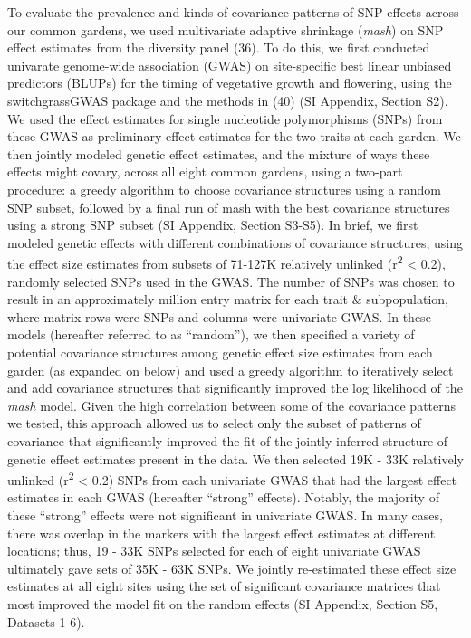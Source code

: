 \documentclass[
  9pt,
  twocolumn,
  twoside]{pnas-new}
\begin{document}
To evaluate the prevalence and kinds of covariance patterns of SNP
effects across our common gardens, we used multivariate adaptive
shrinkage (\emph{mash}) on SNP effect estimates from the diversity panel
(36). To do this, we first conducted univarate genome-wide association
(GWAS) on site-specific best linear unbiased predictors (BLUPs) for the
timing of vegetative growth and flowering, using the switchgrassGWAS
package and the methods in (40) (SI Appendix, Section S2). We used the
effect estimates for single nucleotide polymorphisms (SNPs) from these
GWAS as preliminary effect estimates for the two traits at each garden.
We then jointly modeled genetic effect estimates, and the mixture of
ways these effects might covary, across all eight common gardens, using
a two-part procedure: a greedy algorithm to choose covariance structures
using a random SNP subset, followed by a final run of mash with the best
covariance structures using a strong SNP subset (SI Appendix, Section
S3-S5). In brief, we first modeled genetic effects with different
combinations of covariance structures, using the effect size estimates
from subsets of 71-127K relatively unlinked (r\textsuperscript{2}
\textless{} 0.2), randomly selected SNPs used in the GWAS. The number of
SNPs was chosen to result in an approximately million entry matrix for
each trait \& subpopulation, where matrix rows were SNPs and columns
were univariate GWAS. In these models (hereafter referred to as
``random''), we then specified a variety of potential covariance
structures among genetic effect size estimates from each garden (as
expanded on below) and used a greedy algorithm to iteratively select and
add covariance structures that significantly improved the log likelihood
of the \emph{mash} model. Given the high correlation between some of the
covariance patterns we tested, this approach allowed us to select only
the subset of patterns of covariance that significantly improved the fit
of the jointly inferred structure of genetic effect estimates present in
the data. We then selected 19K - 33K relatively unlinked
(r\textsuperscript{2} \textless{} 0.2) SNPs from each univariate GWAS
that had the largest effect estimates in each GWAS (hereafter ``strong''
effects). Notably, the majority of these ``strong'' effects were not
significant in univariate GWAS. In many cases, there was overlap in the
markers with the largest effect estimates at different locations; thus,
19 - 33K SNPs selected for each of eight univariate GWAS ultimately gave
sets of 35K - 63K SNPs. We jointly re-estimated these effect size
estimates at all eight sites using the set of significant covariance
matrices that most improved the model fit on the random effects (SI
Appendix, Section S5, Datasets 1-6).
\end{document}
